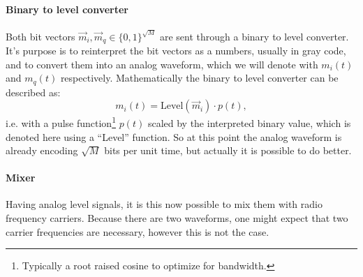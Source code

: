 \paragraph{Binary to level converter}


Both bit vectors \(\vec{m}_i, \vec{m}_q \in \{0,1\}^{\sqrt{M}}\) are sent through a binary to level converter. It's purpose is to reinterpret the bit vectors as a numbers, usually in gray code, and to convert them into an analog waveform, which we will denote with \(m_i(t)\) and \(m_q(t)\) respectively. Mathematically the binary to level converter can be described as:
\begin{equation}
	m_i(t) = \text{Level}(\vec{m}_i) \cdot p(t),
\end{equation}
i.e. with a pulse function\footnote{Typically a root raised cosine to optimize for bandwidth.} \(p(t)\) scaled by the interpreted binary value, which is denoted here using a ``Level'' function. So at this point the analog waveform is already encoding \(\sqrt{M}\) bits per unit time, but actually it is possible to do better.

\paragraph{Mixer}

Having analog level signals, it is this now possible to mix them with radio frequency carriers. Because there are two waveforms, one might expect that two carrier frequencies are necessary, however this is not the case.

